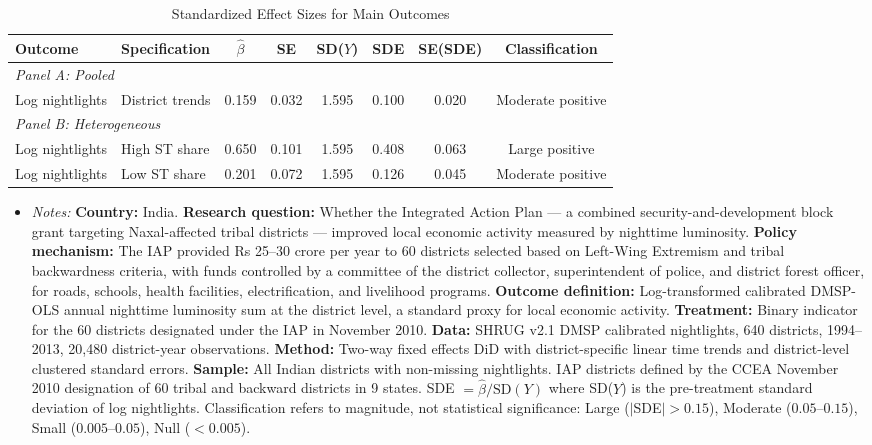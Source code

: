 \begin{table}[H]
\centering
\caption{Standardized Effect Sizes for Main Outcomes}
\label{tab:sde}
\begin{threeparttable}
\begin{adjustbox}{max width=\textwidth}
\begin{tabular}{llcccccc}
\toprule
Outcome & Specification & $\hat{\beta}$ & SE & SD($Y$) & SDE & SE(SDE) & Classification \\
\midrule
\multicolumn{8}{l}{\textit{Panel A: Pooled}} \\
Log nightlights & District trends & 0.159 & 0.032 & 1.595 & 0.100 & 0.020 & Moderate positive \\
\midrule
\multicolumn{8}{l}{\textit{Panel B: Heterogeneous}} \\
Log nightlights & High ST share & 0.650 & 0.101 & 1.595 & 0.408 & 0.063 & Large positive \\
Log nightlights & Low ST share & 0.201 & 0.072 & 1.595 & 0.126 & 0.045 & Moderate positive \\
\bottomrule
\end{tabular}
\end{adjustbox}
\par\vspace{0.3em}
{\footnotesize
\begin{itemize}[leftmargin=*]
\item \textit{Notes:} \textbf{Country:} India. \textbf{Research question:} Whether the Integrated Action Plan --- a combined security-and-development block grant targeting Naxal-affected tribal districts --- improved local economic activity measured by nighttime luminosity. \textbf{Policy mechanism:} The IAP provided Rs 25--30 crore per year to 60 districts selected based on Left-Wing Extremism and tribal backwardness criteria, with funds controlled by a committee of the district collector, superintendent of police, and district forest officer, for roads, schools, health facilities, electrification, and livelihood programs. \textbf{Outcome definition:} Log-transformed calibrated DMSP-OLS annual nighttime luminosity sum at the district level, a standard proxy for local economic activity. \textbf{Treatment:} Binary indicator for the 60 districts designated under the IAP in November 2010. \textbf{Data:} SHRUG v2.1 DMSP calibrated nightlights, 640 districts, 1994--2013, 20,480 district-year observations. \textbf{Method:} Two-way fixed effects DiD with district-specific linear time trends and district-level clustered standard errors. \textbf{Sample:} All Indian districts with non-missing nightlights. IAP districts defined by the CCEA November 2010 designation of 60 tribal and backward districts in 9 states. SDE $= \hat{\beta} / \text{SD}(Y)$ where SD($Y$) is the pre-treatment standard deviation of log nightlights. Classification refers to magnitude, not statistical significance: Large ($|$SDE$| > 0.15$), Moderate ($0.05$--$0.15$), Small ($0.005$--$0.05$), Null ($< 0.005$).
\end{itemize}}
\end{threeparttable}
\end{table}

